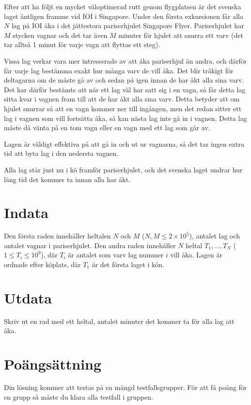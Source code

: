 %
%
Efter att ha följt en mycket väloptimerad rutt genom flygplatsen är det svenska laget äntligen framme vid IOI i Singapore.
Under den första exkursionen får alla $N$ lag på IOI åka i det jättestora pariserhjulet Singapore Flyer.
Pariserhjulet har $M$ stycken vagnar och det tar även $M$ minuter för hjulet att snurra ett varv
(det tar alltså 1 minut för varje vagn att flyttas ett steg).

Vissa lag verkar vara mer intresserade av att åka pariserhjul än andra, och därför får varje lag bestämma exakt hur många varv de vill åka.
Det blir tråkigt för deltagarna om de måste gå av och sedan på igen innan de har åkt alla sina varv.
Det har därför bestämts att när ett lag väl har satt sig i en vagn, så får detta lag sitta kvar i vagnen fram till att de har åkt alla sina varv.
Detta betyder att om hjulet snurrar så att en vagn kommer ner till ingången, men det redan sitter ett lag i vagnen som vill fortsätta åka,
så kan nästa lag inte gå in i vagnen. Detta lag måste då vänta på en tom vagn eller en vagn med ett lag som går av.

Lagen är väldigt effektiva på att gå in och ut ur vagnarna, så det tar ingen extra tid att byta lag i den nedersta vagnen.

Alla lag står just nu i kö framför pariserhjulet, och det svenska laget undrar hur lång tid det kommer ta innan alla har åkt.

\section*{Indata}
Den första raden innehåller heltalen $N$ och $M$ ($N,M \leq 2 \times 10^5$),
antalet lag och antalet vagnar i pariserhjulet.
Den andra raden innehåller $N$ heltal $T_1, \dots , T_N$ ($1 \leq T_i \leq 10^9$), där $T_i$ är antalet som varv lag
nummer $i$ vill åka. Lagen är ordnade efter köplats, där $T_1$ är det första laget i kön.

\section*{Utdata}
Skriv ut en rad med ett heltal, antalet minuter det kommer ta för alla lag att åka.

\section*{Poängsättning}
Din lösning kommer att testas på en mängd testfallsgrupper.
För att få poäng för en grupp så måste du klara alla testfall i gruppen.

